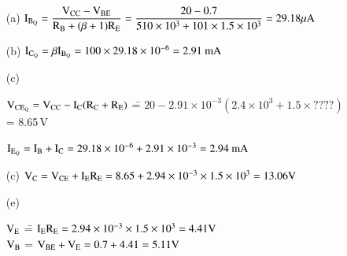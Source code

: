 \begin{solution}
\begin{itemize}
\item[(a)] $\textrm{I}_{\textrm{B}_{\textrm{Q}}}=\dfrac{\textrm{V}_{\text{CC}}-\textrm{V}_{\text{BE}}}{\textrm{R}_{\textrm{B}}+(\beta+1)\textrm{R}_{\textrm{E}}}=\dfrac{20-0.7}{510\times 10^{3}+101\times 1.5\times 10^{3}}=29.18\mu\textrm{A}$

\item[(b)] $\textrm{I}_{\textrm{C}_{\textrm{Q}}}=\beta \textrm{I}_{\textrm{B}_{\textrm{Q}}}=100\times 29.18\times 10^{-6}=2.91\text{~mA}$

\item[(c)] 
\begin{tabbing}
$\textrm{V}_{\text{CE}_{\textrm{Q}}}=\textrm{V}_{\text{CC}}-\textrm{I}_{\textrm{C}}(\textrm{R}_{\textrm{C}}+\textrm{R}_{\textrm{E}})$ \== $20-2.91\times 10^{-3}(2.4\times 10^{3}+1.5\times ????)$\\[4pt]
\>= 8.65\,V
\end{tabbing}

$\textrm{I}_{\textrm{E}_{\textrm{Q}}}=\textrm{I}_{\textrm{B}}+\textrm{I}_{\textrm{C}}=29.18\times 10^{-6}+2.91\times 10^{-3}=2.94\text{~mA}$

\item[(c)] $\textrm{V}_{\textrm{C}}=\textrm{V}_{\text{CE}}+\textrm{I}_{\textrm{E}}\textrm{R}_{\textrm{E}}=8.65+2.94\times 10^{-3}\times 1.5\times 10^{3}=13.06\textrm{V}$

\item[(e)]
\begin{tabbing}
$\textrm{V}_{\textrm{E}}$ \== $\textrm{I}_{\textrm{E}}\textrm{R}_{\textrm{E}}=2.94\times 10^{-3}\times 1.5\times 10^{3}=4.41\textrm{V}$\\[4pt]
$\textrm{V}_{\textrm{B}}$ \>= $\textrm{V}_{\text{BE}}+\textrm{V}_{\textrm{E}}=0.7+4.41=5.11\textrm{V}$
\end{tabbing}
\end{itemize}
\end{solution}

\eject

